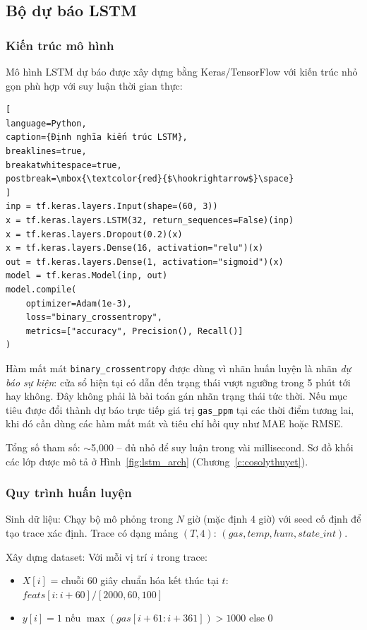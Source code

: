 \subsection{Bộ dự báo LSTM}

\subsubsection*{Kiến trúc mô hình}

Mô hình LSTM dự báo được xây dựng bằng Keras/TensorFlow với kiến trúc nhỏ gọn phù hợp với suy luận thời gian thực:

\begin{lstlisting}[
language=Python,
caption={Định nghĩa kiến trúc LSTM},
breaklines=true,
breakatwhitespace=true,
postbreak=\mbox{\textcolor{red}{$\hookrightarrow$}\space}
]
inp = tf.keras.layers.Input(shape=(60, 3))
x = tf.keras.layers.LSTM(32, return_sequences=False)(inp)
x = tf.keras.layers.Dropout(0.2)(x)
x = tf.keras.layers.Dense(16, activation="relu")(x)
out = tf.keras.layers.Dense(1, activation="sigmoid")(x)
model = tf.keras.Model(inp, out)
model.compile(
    optimizer=Adam(1e-3),
    loss="binary_crossentropy",
    metrics=["accuracy", Precision(), Recall()]
)
\end{lstlisting}

Hàm mất mát \texttt{binary\_crossentropy} được dùng vì nhãn huấn luyện là nhãn \emph{dự báo sự kiện}: cửa sổ hiện tại có dẫn đến trạng thái vượt ngưỡng trong 5 phút tới hay không. Đây không phải là bài toán gán nhãn trạng thái tức thời. Nếu mục tiêu được đổi thành dự báo trực tiếp giá trị \texttt{gas\_ppm} tại các thời điểm tương lai, khi đó cần dùng các hàm mất mát và tiêu chí hồi quy như MAE hoặc RMSE.

Tổng số tham số: $\sim$5,000 -- đủ nhỏ để suy luận trong vài millisecond. Sơ đồ khối các lớp được mô tả ở Hình~\ref{fig:lstm_arch} (Chương~\ref{c:cosolythuyet}).

\subsubsection*{Quy trình huấn luyện}

Sinh dữ liệu: Chạy bộ mô phỏng trong $N$ giờ (mặc định 4 giờ) với seed cố định để tạo trace xác định. Trace có dạng mảng $(T, 4)$: $(gas, temp, hum, state\_int)$.

Xây dựng dataset: Với mỗi vị trí $i$ trong trace:
\begin{itemize}
  \item $X[i]$ = chuỗi 60 giây chuẩn hóa kết thúc tại $t$: $feats[i:i+60] / [2000, 60, 100]$
  \item $y[i] = 1$ nếu $\max(gas[i+61:i+361]) > 1000$ else $0$
\end{itemize}

